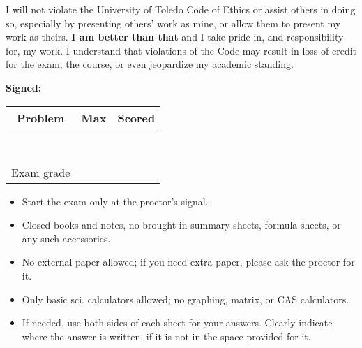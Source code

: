 \documentclass[10pt,twoside,sfsidenotes]{tufte-handout}
\date{} %
\begin{document}
\setlength\abovedisplayskip{2pt}
\setlength\belowdisplayskip{2pt}
\setlength\abovedisplayshortskip{2pt}
\setlength\belowdisplayshortskip{2pt}

\vspace*{1in}


   {\large I will not violate the University of Toledo Code of Ethics or assist others in doing so, especially by presenting others' work as mine, or allow them to present my work as theirs. \textbf{I am better than that} and I take pride in, and responsibility for, my work. I understand that violations of the Code may result in loss of credit for the exam, the course, or even jeopardize my academic standing.

\vspace{.5in}

    \textbf{Signed:}
  }

  \vfill


\begin{center}\Large
  \begin{tabular}{c | c | c}
    Problem & Max & Scored \\ \hline
     & & \\ \hline
     & & \\ \hline
     & & \\ \hline
     & & \\ \hline
     & & \\ \hline
     & & \\ \hline
     & & \\ \hline
     & & \\ \hline
    Exam grade & & \\ \hline
  \end{tabular}
  \end{center}

  \vfill

\begin{fullwidth}
{\large
  \begin{itemize}
    \item Start the exam only at the proctor's signal.
  \item Closed books and notes, no brought-in summary sheets, formula sheets, or any such accessories.
  \item No external paper allowed; if you need extra paper, please ask the proctor for it.
  \item Only basic sci. calculators allowed; no graphing, matrix, or CAS calculators.
  \item If needed, use both sides of each sheet for your answers. Clearly indicate where the answer is written, if it is not in the space provided for it.
  \end{itemize}
  }
\end{fullwidth}
\clearpage
\end{document}
